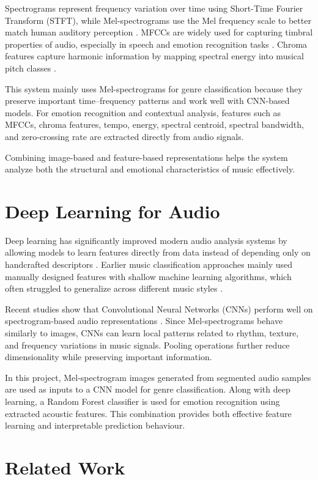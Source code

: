 \documentclass[12pt,a4paper]{report}
\begin{document}
Spectrograms represent frequency variation over time using Short-Time Fourier Transform (STFT), while Mel-spectrograms use the Mel frequency scale to better match human auditory perception \cite{r3,r5,r14}. MFCCs are widely used for capturing timbral properties of audio, especially in speech and emotion recognition tasks \cite{r9,r14}. Chroma features capture harmonic information by mapping spectral energy into musical pitch classes \cite{r2,r11,r12}.

This system mainly uses Mel-spectrograms for genre classification because they preserve important time--frequency patterns and work well with CNN-based models. For emotion recognition and contextual analysis, features such as MFCCs, chroma features, tempo, energy, spectral centroid, spectral bandwidth, and zero-crossing rate are extracted directly from audio signals.

Combining image-based and feature-based representations helps the system analyze both the structural and emotional characteristics of music effectively.

\section{Deep Learning for Audio}

Deep learning has significantly improved modern audio analysis systems by allowing models to learn features directly from data instead of depending only on handcrafted descriptors \cite{r13,r14}. Earlier music classification approaches mainly used manually designed features with shallow machine learning algorithms, which often struggled to generalize across different music styles \cite{r1,r17}.

Recent studies show that Convolutional Neural Networks (CNNs) perform well on spectrogram-based audio representations \cite{r3,r4,r5}. Since Mel-spectrograms behave similarly to images, CNNs can learn local patterns related to rhythm, texture, and frequency variations in music signals. Pooling operations further reduce dimensionality while preserving important information.

In this project, Mel-spectrogram images generated from segmented audio samples are used as inputs to a CNN model for genre classification. Along with deep learning, a Random Forest classifier is used for emotion recognition using extracted acoustic features. This combination provides both effective feature learning and interpretable prediction behaviour.

\section{Related Work}
\end{document}
